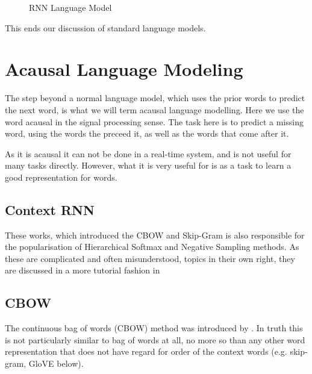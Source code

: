 \documentclass[parskip]{komatufte}
\begin{document}
\begin{figure}
	\centering
	 
	\caption{\label{fig:neural-language-model} RNN Language Model}
\end{figure}

This ends our discussion of standard language models.


\section{Acausal Language Modeling}
The step beyond a normal language model,
which uses the prior words to predict the next word,
is what we will term acausal language modelling.
Here we use the word acausal in the signal processing sense.
The task here is to predict a missing word, using the words the preceed it, as well as the words that come after it.

As it is acausal it can not be done in a real-time system, and is not useful for many tasks directly.
However, what it is very useful for is as a task to learn a good representation for words.


\subsection{Context RNN}





These works, which introduced the CBOW and Skip-Gram is also responsible for the popularisation of Hierarchical Softmax and Negative Sampling methods.
As these are complicated and often misunderstood, topics in their own right, they are discussed in a more tutorial fashion in  

\subsection{CBOW}
The continuous bag of words (CBOW) method was introduced by .
In truth this is not particularly similar to bag of words at all, no more so than any other word representation that does not have regard for order of the context words (e.g. skip-gram, GloVE below).
\end{document}
